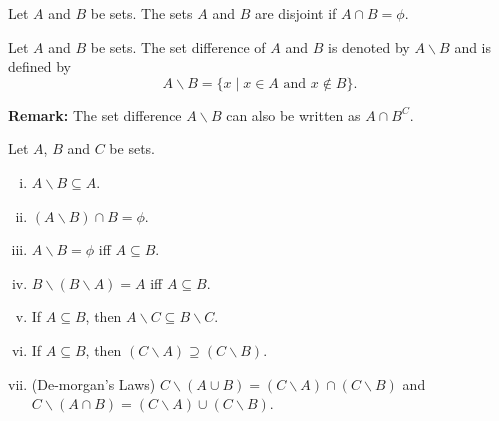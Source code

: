 \documentclass[a4paper,english,12pt]{article}
\begin{document}
\begin{defn}
 Let $A$ and $B$ be sets. The sets $A$ and $B$ are disjoint if $A \cap B = \phi$.
\end{defn}

\begin{defn}
 Let $A$ and $B$ be sets. The set difference of $A$ and $B$ is denoted by $A \backslash B$ and is defined by 
 \begin{equation}
  A \backslash B = \{ x \; | \;  x \in A \text{ and } x \notin B  \}.
 \end{equation}
\end{defn}
\textbf{Remark:} The set difference $A \backslash B$ can also be written as $A \cap B^{C}$.

\begin{thm}
 Let $A$, $B$ and $C$ be sets.
 \begin{enumerate}[i)]
  \item $A \backslash B \subseteq A$.
  \item $(A \backslash B) \cap B = \phi$.
  \item $A \backslash B = \phi$ iff $A \subseteq B$.
  \item $B \backslash (B \backslash A) = A$ iff $A \subseteq B$.
  \item If $A \subseteq B$, then $A \backslash C \subseteq B \backslash C$.
  \item If $A \subseteq B$, then $(C \backslash A) \supseteq (C \backslash B)$.
  \item (De-morgan's Laws) $C \backslash (A \cup B) = (C \backslash A) \cap (C \backslash B)$ and $C \backslash (A \cap B) = (C \backslash A) \cup (C \backslash B)$.
 \end{enumerate}
\end{thm}
\end{document}
